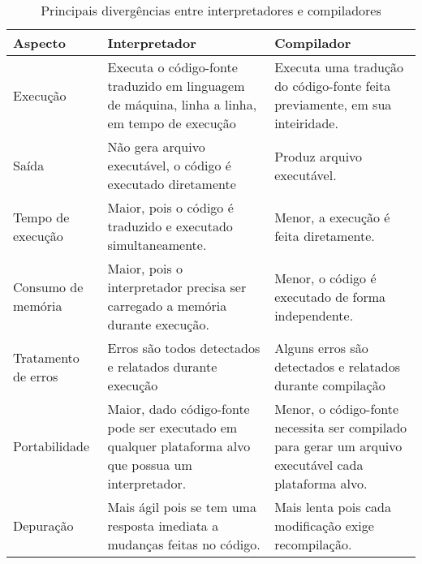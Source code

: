 {	\begin{table}[htbp]
		\centering
		\caption{Principais divergências entre interpretadores e compiladores}
		\label{tab:comparacaoInterpreterCompiler}
		\begin{tabularx}{\linewidth}{ | l | >{\RaggedRight\arraybackslash}X | >{\RaggedRight\arraybackslash}X | }
			\hline
			\textbf{Aspecto}                                              & \textbf{Interpretador} & \textbf{Compilador} \\
			\hline
			Execução                                                      &
			Executa o código-fonte traduzido em linguagem de máquina, linha a
			linha, em tempo de execução                                   &
			Executa uma tradução do código-fonte feita previamente, em sua
			inteiridade.                                                                                                 \\
			\hline
			Saída                                                         &
			Não gera arquivo executável, o código é executado diretamente &
			Produz arquivo executável.                                                                                   \\
			\hline
			Tempo de execução                                             &
			Maior, pois o código é traduzido e executado simultaneamente. &
			Menor, a execução é feita diretamente.                                                                       \\
			\hline
			Consumo de memória                                            &
			Maior, pois o interpretador precisa ser carregado a memória durante
			execução.                                                     &
			Menor, o código é executado de forma independente.                                                           \\
			\hline
			Tratamento de erros                                           &
			Erros são todos detectados e relatados durante execução       &
			Alguns erros são detectados e relatados durante compilação                                                   \\
			\hline
			Portabilidade                                                 &
			Maior, dado código-fonte pode ser executado em qualquer plataforma
			alvo que possua um interpretador.                             &
			Menor, o código-fonte necessita ser compilado para gerar um arquivo
			executável cada plataforma alvo.                                                                             \\
			\hline
			Depuração                                                     &
			Mais ágil pois se tem uma resposta imediata a mudanças feitas no
			código.                                                       &
			Mais lenta pois cada modificação exige recompilação.                                                         \\
			\hline
		\end{tabularx}
	\end{table}

}

